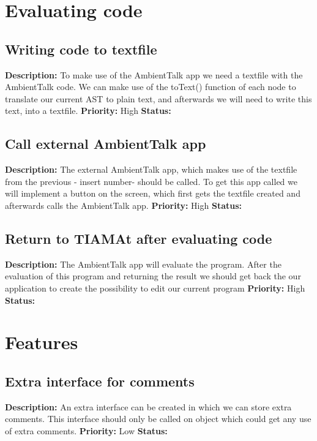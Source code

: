 \documentclass[a4paper,12pt]{report}
\begin{document}
\section{Evaluating code}
\subsection{Writing code to textfile}
\textbf{Description: }To make use of the AmbientTalk app we need a textfile with the AmbientTalk code. We can make use of the toText() function of each node to translate our
current AST to plain text, and afterwards we will need to write this text, into a textfile.  \newline
\textbf{Priority:} High \newline
\textbf{Status: } \newline
\subsection{Call external AmbientTalk app}
\textbf{Description: }The external AmbientTalk app, which makes use of the textfile from the previous - insert number- should be called. To get this app called we will implement
a button on the screen, which first gets the textfile created and afterwards calls the AmbientTalk app. \newline
\textbf{Priority:} High \newline
\textbf{Status: } \newline
\subsection{Return to TIAMAt after evaluating code}
\textbf{Description: } The AmbientTalk app will evaluate the program. After the evaluation of this program and returning the result we should get back the our application to
create the possibility to edit our current program\newline
\textbf{Priority:} High \newline
\textbf{Status: } \newline
\section{Features}
\subsection{Extra interface for comments}
\textbf{Description: } An extra interface can be created in which we can store extra comments. This interface should only be called on object which could get any use of extra comments.
 \newline
\textbf{Priority:} Low \newline
\textbf{Status: } \newline
\end{document}
